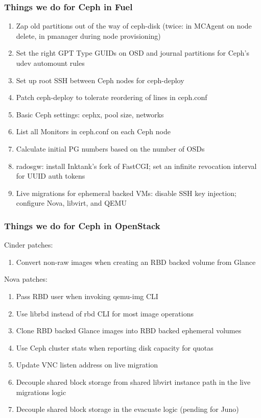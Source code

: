 \documentclass[hyperref=unicode,utf8,xcolor=pst,aspectratio=169]{beamer}
\begin{document}
\begin{frame}
	\frametitle{Things we do for Ceph in Fuel}
	\begin{enumerate}
		\item Zap old partitions out of the way of ceph-disk (twice: in
			MCAgent on node delete, in pmanager during node
			provisioning)
		\item Set the right GPT Type GUIDs on OSD and journal
			partitions for Ceph's udev automount rules
		\item Set up root SSH between Ceph nodes for ceph-deploy
		\item Patch ceph-deploy to tolerate reordering of lines in
			ceph.conf
		\item Basic Ceph settings: cephx, pool size, networks
		\item List all Monitors in ceph.conf on each Ceph node
		\item Calculate initial PG numbers based on the number of OSDs
		\item radosgw: install Inktank's fork of FastCGI; set an
			infinite revocation interval for UUID auth tokens
		\item Live migrations for ephemeral backed VMs: disable SSH key
			injection; configure Nova, libvirt, and QEMU
	\end{enumerate}
\end{frame}

\begin{frame}
	\frametitle{Things we do for Ceph in OpenStack}
	Cinder patches:
	\begin{enumerate}
		\item Convert non-raw images when creating an
			RBD backed volume from Glance
	\end{enumerate}

	Nova patches:
	\begin{enumerate}
		\item Pass RBD user when invoking qemu-img CLI
		\item Use librbd instead of rbd CLI for most
			image operations
		\item Clone RBD backed Glance images into RBD
			backed ephemeral volumes
		\item Use Ceph cluster stats when reporting
			disk capacity for quotas
		\item Update VNC listen address on live migration
		\item Decouple shared block storage from shared libvirt
			instance path in the live migrations logic
		\item Decouple shared block storage in the evacuate logic
			(pending for Juno)
	\end{enumerate}
\end{frame}
\end{document}
